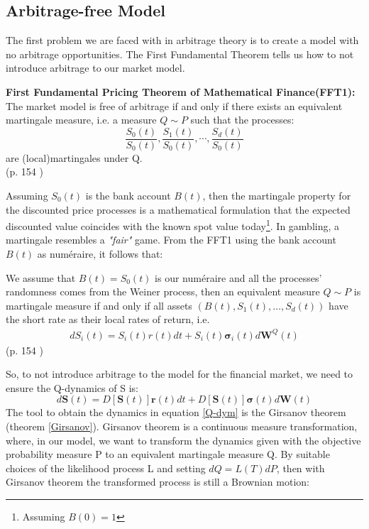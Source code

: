 \subsection{Arbitrage-free Model}
The first problem we are faced with in arbitrage theory is to create a model with no arbitrage opportunities. The First Fundamental Theorem tells us how to not introduce arbitrage to our market model.
\begin{theorem}\label{FFT1}
\textbf{First Fundamental Pricing Theorem of Mathematical Finance(FFT1): } The market model is free of arbitrage if and only if there exists an equivalent martingale measure, i.e. a measure $Q\sim P$ such that the processes:
$$\frac{S_0(t)}{S_0(t)}, \frac{S_1(t)}{S_0(t)}, \cdots, \frac{S_d(t)}{S_0(t)}$$
are (local)martingales under Q.
\\ \null \hfill (p. 154 \parencite{finKont})
\end{theorem}
Assuming $S_0(t)$ is the bank account $B(t)$, then the martingale property for the discounted price processes is a mathematical formulation that the expected discounted value coincides with the known spot value today\footnote{Assuming $B(0)=1$}. In gambling, a martingale resembles a \textsl{"fair"} game. From the FFT1 using the bank account $B(t)$ as numéraire, it follows that:
\theoremstyle{proposition}
\begin{proposition}{}
We assume that $B(t)=S_0(t)$ is our numéraire and all the processes' randomness comes from the Weiner process, then an equivalent measure $Q \sim P$ is martingale measure if and only if all assets $(B(t), S_1(t), \ldots, S_d(t))$ have the short rate as their local rates of return, i.e.
\begin{align*}
dS_i(t)=S_i(t)r(t)dt+S_i(t)\bm{\sigma}_i(t)d\bm{W}^Q(t)
\end{align*}
\null \hfill (p. 154 \parencite{finKont})
\end{proposition}
So, to not introduce arbitrage to the model for the financial market, we need to ensure the Q-dynamics of S is:
\begin{equation}\label{Q-dym}
d\bm{S}(t)=D[\bm{S}(t)]\bm{r}(t)dt+D[\bm{S}(t)]\bm{\sigma}(t)d\bm{W}(t)
\end{equation}
The tool to obtain the dynamics in equation \eqref{Q-dym} is the Girsanov theorem (theorem \ref{Girsanov}). Girsanov theorem is a continuous measure transformation, where, in our model, we want to transform the dynamics given with the objective probability measure P to an equivalent martingale measure Q. By suitable choices of the likelihood process L and setting $dQ=L(T)dP$, then with Girsanov theorem the transformed process is still a Brownian motion:

